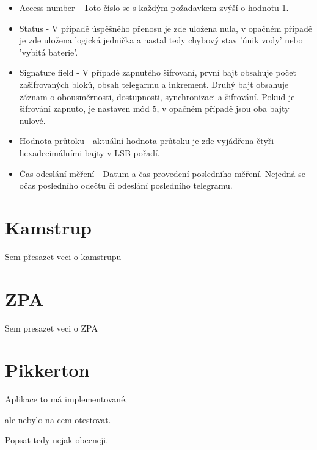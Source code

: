 \begin{itemize}
	\item Access number - Toto číslo se s každým požadavkem zvýší o hodnotu 1.
	\item Status - V případě úspěšného přenosu je zde uložena nula, v opačném případě je zde uložena logická jednička a nastal tedy chybový stav 'únik vody' nebo 'vybitá baterie'.
	\item Signature field - V případě zapnutého šifrovaní, první bajt obsahuje počet zašifrovaných bloků, obsah telegarmu a inkrement. Druhý bajt obsahuje záznam o obousměrnosti, dostupnosti, synchronizaci a šifrování. Pokud je šifrování zapnuto, je nastaven mód 5, v opačném případě jsou oba bajty nulové.
	\item Hodnota průtoku - aktuální hodnota průtoku je zde vyjádřena čtyři hexadecimálními bajty v LSB pořadí.
	\item Čas odeslání měření - Datum a čas provedení posledního měření. Nejedná se očas posledního odečtu či odeslání posledního telegramu.
\end{itemize}



	
	\section{Kamstrup}
	
	\colorbox[rgb]{0,1,0}{Sem přesazet veci o kamstrupu}
	
	
	\section{ZPA}
	\colorbox[rgb]{0,1,0}{Sem presazet veci o ZPA}
	
	
	

\section{Pikkerton}

\colorbox[rgb]{0,1,0}{Aplikace to má implementované,} 

\colorbox[rgb]{0,1,0}{ale nebylo na cem otestovat.}

\colorbox[rgb]{0,1,0}{Popsat tedy nejak obecneji.}
	
	
	



